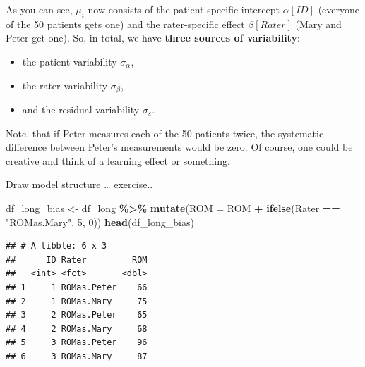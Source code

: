 \documentclass[
]{book}
\newenvironment{Shaded}{\begin{snugshade}}{\end{snugshade}}
\newcommand{\AttributeTok}[1]{\textcolor[rgb]{0.13,0.29,0.53}{#1}}
\newcommand{\DecValTok}[1]{\textcolor[rgb]{0.00,0.00,0.81}{#1}}
\newcommand{\FunctionTok}[1]{\textcolor[rgb]{0.13,0.29,0.53}{\textbf{#1}}}
\newcommand{\NormalTok}[1]{#1}
\newcommand{\OtherTok}[1]{\textcolor[rgb]{0.56,0.35,0.01}{#1}}
\newcommand{\SpecialCharTok}[1]{\textcolor[rgb]{0.81,0.36,0.00}{\textbf{#1}}}
\newcommand{\StringTok}[1]{\textcolor[rgb]{0.31,0.60,0.02}{#1}}
\providecommand{\tightlist}{%
  \setlength{\itemsep}{0pt}\setlength{\parskip}{0pt}}
\begin{document}
As you can see, \(\mu_i\) now consists of the patient-specific intercept \(\alpha[ID]\)
(everyone of the 50 patients gets one)
and the rater-specific effect \(\beta[Rater]\) (Mary and Peter get one).
So, in total, we have \textbf{three sources of variability}:

\begin{itemize}
\tightlist
\item
  the patient variability \(\sigma_{\alpha}\),
\item
  the rater variability \(\sigma_{\beta}\),
\item
  and the residual variability \(\sigma_{\varepsilon}\).
\end{itemize}

Note, that if Peter measures each of the 50 patients twice,
the systematic difference between Peter's measurements would
be zero. Of course, one could be creative and think of
a learning effect or something.

Draw model structure \ldots{} exercise..

\begin{Shaded}
\begin{Highlighting}[]
\NormalTok{df\_long\_bias }\OtherTok{\textless{}{-}}\NormalTok{ df\_long }\SpecialCharTok{\%\textgreater{}\%}
  \FunctionTok{mutate}\NormalTok{(}\AttributeTok{ROM =}\NormalTok{ ROM }\SpecialCharTok{+} \FunctionTok{ifelse}\NormalTok{(Rater }\SpecialCharTok{==} \StringTok{"ROMas.Mary"}\NormalTok{, }\DecValTok{5}\NormalTok{, }\DecValTok{0}\NormalTok{))}
\FunctionTok{head}\NormalTok{(df\_long\_bias)}
\end{Highlighting}
\end{Shaded}

\begin{verbatim}
## # A tibble: 6 x 3
##      ID Rater         ROM
##   <int> <fct>       <dbl>
## 1     1 ROMas.Peter    66
## 2     1 ROMas.Mary     75
## 3     2 ROMas.Peter    65
## 4     2 ROMas.Mary     68
## 5     3 ROMas.Peter    96
## 6     3 ROMas.Mary     87
\end{verbatim}
\end{document}

